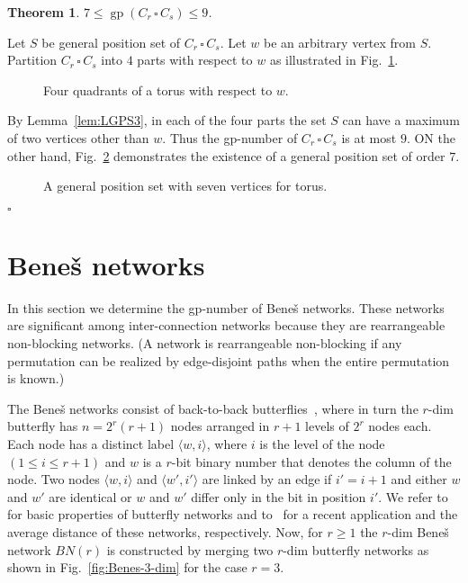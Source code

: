 \documentclass[12pt]{article}
\newtheorem{theorem}{Theorem}[section]
\newcommand{\proof}{\noindent{\bf Proof.\ }}
\newcommand{\qed}{\hfill $\square$\medskip}
\def\cp{\,\square\,}
\DeclareMathOperator {\gp} {gp}
\begin{document}
\begin{theorem}
	\label{TTOR79}
$7\le \gp(C_r\cp C_s)\le 9$. 
\end{theorem}

\proof 
Let $S$ be general position set of $C_r\cp C_s$. Let $w$ be an arbitrary vertex from $S$. Partition $C_r\cp C_s$ into $4$ parts with respect to $w$ as illustrated in Fig.~\ref{fig:FTORPART}. 

\begin{figure}[ht!]
	\begin{center}
	\end{center}
	\caption{Four quadrants of a torus with respect to $w$.}
	\label{fig:FTORPART}
\end{figure}

By Lemma~\ref{lem:LGPS3}, in each of the four parts the set $S$ can have a maximum of two vertices other than $w$. Thus the gp-number of $C_r\cp C_s$ is at most $9$. ON the other hand, Fig.~\ref{fig:FTORGPS} demonstrates the existence of a general position set of order $7$. 

\begin{figure}[ht!]
	\begin{center}
	\end{center}
	\caption{A general position set with seven vertices for torus.}
	\label{fig:FTORGPS}
\end{figure}
\qed

\section{Bene\v{s} networks}
\label{sec:benes}

In this section we determine the gp-number of Bene\v{s} networks. These networks are significant among inter-connection networks because they are rearrangeable non-blocking networks. (A network is rearrangeable non-blocking if any permutation can be realized by edge-disjoint paths when the entire permutation is known.) 

The Bene\v{s} networks consist of back-to-back butterflies~\cite{MaAb08}, where in turn the $r$-dim butterfly has $n=2^{r}(r+1)$ nodes arranged in $r+1$ levels of $2^{r}$ nodes each. Each node has a distinct label $\langle w,i\rangle $, where $i$ is the level of the node $(1\leq i\leq r+1)$ and $w$ is a $r$-bit binary number that denotes the column of the node. Two nodes $\langle w,i\rangle $ and $\langle w',i'\rangle $ are linked by an edge if $i'=i+1$ and either $w$ and $w'$ are identical or $w$ and $w'$ differ only in the bit in position $i'$. We refer to~\cite[Section 11.4]{xu-2013} for basic properties of butterfly networks and to~\cite{burckel-2014, KlMa-2016} for a recent application and the average distance of these networks, respectively. Now, for $r\ge 1$ the $r$-dim Bene\v{s} network $BN(r)$ is constructed by merging two $r$-dim butterfly networks as shown in Fig.~\ref{fig:Benes-3-dim} for the case $r=3$. 
\end{document}
